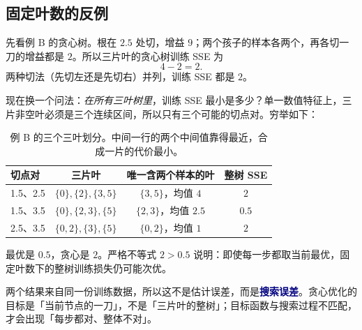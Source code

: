 \documentclass[11pt,a4paper,fontset=windows,zihao=-4]{ctexart}
\newcommand{\hl}[1]{\textcolor{navy}{\textbf{#1}}}
\newcommand{\tabhead}{\sffamily\bfseries\color{navy}}
\begin{document}
\subsection{固定叶数的反例}

先看例 B 的贪心树。根在 $2.5$ 处切，增益 $9$；两个孩子的样本各两个，再各切一刀的增益都是 $2$。所以三片叶的贪心树训练 SSE 为
\[
  4-2=2 .
\]
两种切法（先切左还是先切右）并列，训练 SSE 都是 $2$。

现在换一个问法：\emph{在所有三叶树里}，训练 SSE 最小是多少？单一数值特征上，三片非空叶必须是三个连续区间，所以只有三个可能的切点对。穷举如下：

\begin{table}[htbp]
\centering
\small
\begin{tabular}{@{}lccc@{}}
\toprule
\rowcolor{navy!7}
\tabhead 切点对 & \tabhead 三片叶 & \tabhead 唯一含两个样本的叶 & \tabhead 整树 SSE\\
\midrule
1.5、2.5 & $\{0\},\{2\},\{3,5\}$ & $\{3,5\}$，均值 $4$ & $2$\\
1.5、3.5 & $\{0\},\{2,3\},\{5\}$ & $\{2,3\}$，均值 $2.5$ & $\mathbf{0.5}$\\
2.5、3.5 & $\{0,2\},\{3\},\{5\}$ & $\{0,2\}$，均值 $1$ & $2$\\
\bottomrule
\end{tabular}
\caption{例 B 的三个三叶划分。中间一行的两个中间值靠得最近，合成一片的代价最小。}
\label{tab:threeleaf}
\end{table}

最优是 $0.5$，贪心是 $2$。严格不等式 $2>0.5$ 说明：即使每一步都取当前最优，固定叶数下的整树训练损失仍可能次优。

两个结果来自同一份训练数据，所以这不是估计误差，而是\hl{搜索误差}。贪心优化的目标是「当前节点的一刀」，不是「三片叶的整树」；目标函数与搜索过程不匹配，才会出现「每步都对、整体不对」。
\end{document}
